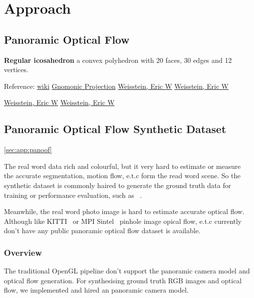 

\chapter{Approach}

\section{Panoramic Optical Flow}


\textbf{Regular icosahedron}
a convex polyhedron with 20 faces, 30 edges and 12 vertices. 

Reference:
\href{https://en.wikipedia.org/wiki/Regular_icosahedron}{wiki}
\href{https://mathworld.wolfram.com/GnomonicProjection.html}{Gnomonic Projection}
\href{https://mathworld.wolfram.com/RegularIcosahedron.html}{Weisstein, Eric W}
\href{https://math.wikia.org/wiki/Icosahedron}{Weisstein, Eric W}

\href{https://en.wikipedia.org/wiki/Gnomonic_projection}{Weisstein, Eric W}
\href{https://www.imo.net/observations/methods/visual-observation/minor/gnomonic/}{Weisstein, Eric W}



\section{Panoramic Optical Flow Synthetic Dataset}\ref{sec:app:panoof}

The real word data rich and colourful, but it very hard to estimate or measure the accurate segmentation, motion flow, e.t.c form the read word scene.
So the synthetic dataset is commonly haired to generate the ground truth data for training or performance evaluation, such as ~\cite{habitat19iccv}.

Meanwhile, the real word photo image is hard to estimate accurate optical flow.
Although like KITTI~\cite{Menze2018JPRS} or MPI Sintel~\cite{Butler:ECCV:2012} pinhole image opical flow, e.t.c currently don't have any public panoramic optical flow dataset is available.

\subsection{Overview}

The traditional OpenGL pipeline don't support the panoramic camera model and optical flow generation.
For synthesising ground truth RGB images and optical flow, we implemented and hired an panoramic camera model.

